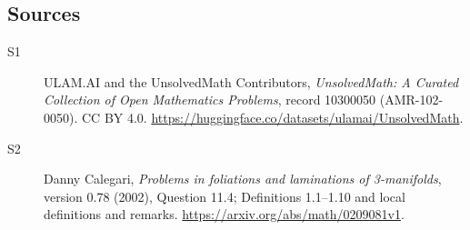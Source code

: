 \documentclass[11pt]{article}
\begin{document}
\subsection{Sources}
\begin{description}
\item[\hypertarget{source:10300050:1}{S1}] ULAM.AI and the UnsolvedMath Contributors, \emph{UnsolvedMath: A Curated Collection of Open Mathematics Problems}, record 10300050 (AMR-102-0050). CC BY 4.0. \url{https://huggingface.co/datasets/ulamai/UnsolvedMath}.
\item[\hypertarget{source:10300050:2}{S2}] Danny Calegari, \emph{Problems in foliations and laminations of 3-manifolds}, version 0.78 (2002), Question 11.4; Definitions 1.1--1.10 and local definitions and remarks. \url{https://arxiv.org/abs/math/0209081v1}.
\end{description}
\label{end:10300050}
\end{document}
